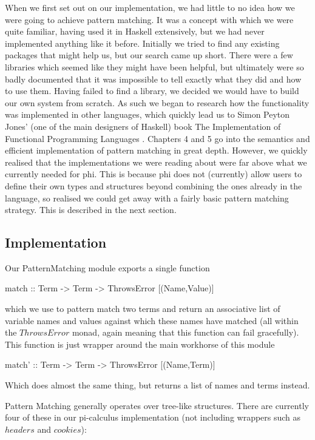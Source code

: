 When we first set out on our implementation, we had little to no idea how we were going to achieve pattern matching. It was a concept with which we were quite familiar, having used it in Haskell extensively, but we had never implemented anything like it before.
Initially we tried to find any existing packages that might help us, but our search came up short. There were a few libraries which seemed like they might have been helpful, but ultimately were so badly documented that it was impossible to tell exactly what they did and how to use them. 
Having failed to find a library, we decided we would have to build our own system from scratch. As such we began to research how the functionality was implemented in other languages, which quickly lead us to Simon Peyton Jones' (one of the main designers of Haskell) book The Implementation of Functional Programming Languages \cite{spj87}. Chapters 4 and 5 go into the semantics and efficient implementation of pattern matching in great depth. However, we quickly realised that the
implementations we were reading about were far above what we currently needed for phi. This is because phi
does not (currently) allow users to define their own types and structures beyond combining the ones already in the language, so realised we could get away with a fairly basic pattern matching strategy. This is described in the next section.

\subsection{Implementation}

Our PatternMatching module exports a single function
\begin{code}
match :: Term -> Term -> ThrowsError [(Name,Value)]
\end{code}
which we use to pattern match two terms and return an associative list of variable names and values against which these names have matched (all within the $ThrowsError$ monad, again meaning that this function can fail gracefully). This function is just wrapper around the main workhorse of this module
\begin{code}
match' :: Term -> Term -> ThrowsError [(Name,Term)]
\end{code}
Which does almost the same thing, but returns a list of names and terms instead.

Pattern Matching generally operates over tree-like structures. There are currently four of these in our pi-calculus implementation (not including wrappers such as $headers$ and $cookies$): 

